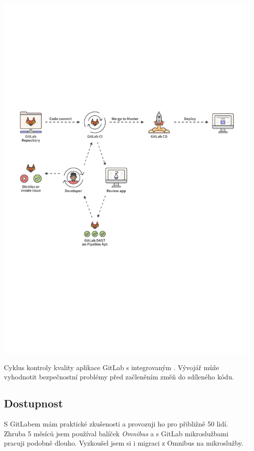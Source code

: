         \begin{iffigure}
            \centering
            \includegraphics[width=\textwidth]{media/gitlab-review-cycle.pdf}
            \caption{Cyklus kontroly kvality aplikace GitLab s integrovaným  \cite{gitlab-app-security}. Vývojář může vyhodnotit bezpečnostní problémy před začleněním změň do sdíleného kódu.}
            \label{fig:gitlab-review-cycle}
        \end{iffigure}

    \subsection{Dostupnost}
        S GitLabem mám praktické zkušenosti a provozuji ho pro přibližně 50 lidí. Zhruba 5 měsíců jsem používal balíček \textit{Omnibus} a s GitLab mikroslužbami pracuji podobně dlouho. Vyzkoušel jsem si i migraci z Omnibus na mikroslužby.

